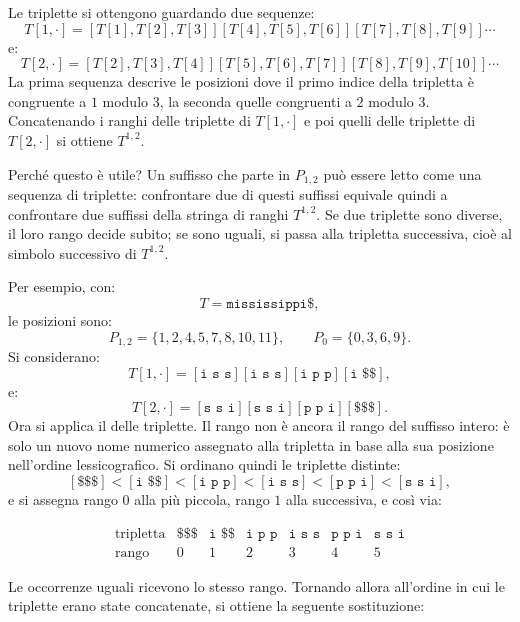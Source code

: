 \documentclass{article}
\theoremstyle{definition}
\numberwithin{equation}{section}
\begin{document}
Le triplette si ottengono guardando due sequenze:
\[
    T[1,\cdot]
    =
    [T[1],T[2],T[3]]
    [T[4],T[5],T[6]]
    [T[7],T[8],T[9]]
    \cdots
\]
e:
\[
    T[2,\cdot]
    =
    [T[2],T[3],T[4]]
    [T[5],T[6],T[7]]
    [T[8],T[9],T[10]]
    \cdots
\]
La prima sequenza descrive le posizioni dove il primo indice della tripletta è congruente a $1$ modulo $3$, la seconda quelle congruenti a $2$ modulo $3$. Concatenando i ranghi delle triplette di $T[1,\cdot]$ e poi quelli delle triplette di $T[2,\cdot]$ si ottiene $T^{1,2}$.

Perché questo è utile? Un suffisso che parte in $P_{1,2}$ può essere letto come una sequenza di triplette: confrontare due di questi suffissi equivale quindi a confrontare due suffissi della stringa di ranghi $T^{1,2}$. Se due triplette sono diverse, il loro rango decide subito; se sono uguali, si passa alla tripletta successiva, cioè al simbolo successivo di $T^{1,2}$.

Per esempio, con:
\[
    T=\texttt{mississippi\$},
\]
le posizioni sono:
\[
    P_{1,2}=\{1,2,4,5,7,8,10,11\},
    \qquad
    P_0=\{0,3,6,9\}.
\]
Si considerano:
\[
    T[1,\cdot]
    =
    [\texttt{i s s}]
    [\texttt{i s s}]
    [\texttt{i p p}]
    [\texttt{i \$ \$}],
\]
e:
\[
    T[2,\cdot]
    =
    [\texttt{s s i}]
    [\texttt{s s i}]
    [\texttt{p p i}]
    [\texttt{\$ \$ \$}].
\]
Ora si applica il \textbf{} delle triplette. Il rango non è ancora il rango del suffisso intero: è solo un nuovo nome numerico assegnato alla tripletta in base alla sua posizione nell'ordine lessicografico. Si ordinano quindi le triplette distinte:
\[
    [\texttt{\$ \$ \$}]<[\texttt{i \$ \$}]<[\texttt{i p p}]<[\texttt{i s s}]<[\texttt{p p i}]<[\texttt{s s i}],
\]
e si assegna rango $0$ alla più piccola, rango $1$ alla successiva, e così via:

\[
    \begin{array}{c|cccccc}
        \text{tripletta} & \texttt{\$ \$ \$} & \texttt{i \$ \$} & \texttt{i p p} & \texttt{i s s} & \texttt{p p i} & \texttt{s s i} \\ \hline
        \text{rango}     & 0                 & 1                & 2              & 3              & 4              & 5
    \end{array}
\]

Le occorrenze uguali ricevono lo stesso rango. Tornando allora all'ordine in cui le triplette erano state concatenate, si ottiene la seguente sostituzione:
\end{document}
